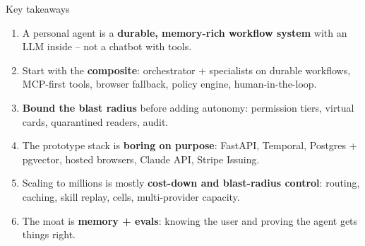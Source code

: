 \documentclass[aspectratio=169,10pt]{beamer}
\begin{document}
\begin{frame}{Key takeaways}
\begin{enumerate}
  \item A personal agent is a \textbf{durable, memory-rich workflow system} with an LLM inside -- not a chatbot with tools.
  \item Start with the \textbf{composite}: orchestrator + specialists on durable workflows, MCP-first tools, browser fallback, policy engine, human-in-the-loop.
  \item \textbf{Bound the blast radius} before adding autonomy: permission tiers, virtual cards, quarantined readers, audit.
  \item The prototype stack is \textbf{boring on purpose}: FastAPI, Temporal, Postgres + pgvector, hosted browsers, Claude API, Stripe Issuing.
  \item Scaling to millions is mostly \textbf{cost-down and blast-radius control}: routing, caching, skill replay, cells, multi-provider capacity.
  \item The moat is \textbf{memory + evals}: knowing the user and proving the agent gets things right.
\end{enumerate}
\end{frame}
\end{document}
